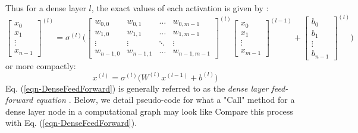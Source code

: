 \documentclass[12pt,letterpaper]{article}
\begin{document}
Thus for a dense layer $l$, the exact values of each activation is given by \cite{Geron,Loy}:
\begin{equation}
\begin{bmatrix}
x_0 \\ x_1 \\ \vdots \\ x_{n-1}
\end{bmatrix}^{(l)} =
\sigma^{(l)} \Bigg(
\begin{bmatrix}
w_{0,0} & w_{0,1} & \hdots & w_{0,m-1} \\
w_{1,0} & w_{1,1} & \hdots & w_{1,m-1} \\
\vdots & \vdots & \ddots & \vdots  \\
w_{n-1,0} & w_{n-1,1} & \hdots & w_{n-1,m-1} 
\end{bmatrix}^{(l)} 
\begin{bmatrix}
x_0 \\ x_1 \\ \vdots \\ x_{m-1}
\end{bmatrix}^{(l-1)} +
\begin{bmatrix}
b_0 \\ b_1 \\ \vdots \\ b_{n-1}
\end{bmatrix}^{(l)} \Bigg)
\end{equation}
or more compactly:
\begin{equation}
\label{eqn-DenseFeedForward}
x^{(l)} = \sigma^{(l)} \Big( W^{(l)} x^{(l-1)} + b^{(l)} \Big)
\end{equation}
Eq. (\ref{eqn-DenseFeedForward}) is generally referred to as the \textit{dense layer feed-forward equation} \cite{Goodfellow}. Below, we detail pseudo-code for what a "Call" method for a dense layer node in a computational graph may look like \cite{Geron,Tensorflow} Compare this process with Eq. (\ref{eqn-DenseFeedForward}).
\end{document}
